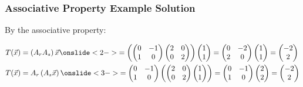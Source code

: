 \begin{frame}
\frametitle{Associative Property Example Solution}

    By the associative property: 

    \begin{align*}
        T(\vec x) &= \left(A_rA_s\right) \vec x \onslide<2->{= \left(\begin{pmatrix} 0&-1\\1&0 \end{pmatrix} \begin{pmatrix} 2&0\\0&2 \end{pmatrix} \right) \begin{pmatrix} 1\\1 \end{pmatrix} = \begin{pmatrix} 0&-2\\2&0 \end{pmatrix}\begin{pmatrix} 1\\1 \end{pmatrix} = \begin{pmatrix} -2\\2 \end{pmatrix}} \\
        T(\vec x) &= A_r\left(A_s \vec x \right) \onslide<3->{= \begin{pmatrix} 0&-1\\1&0 \end{pmatrix} \left( \begin{pmatrix} 2&0\\0&2 \end{pmatrix}  \begin{pmatrix} 1\\1 \end{pmatrix} \right) = \begin{pmatrix} 0&-1\\1&0 \end{pmatrix}\begin{pmatrix} 2\\2 \end{pmatrix} = \begin{pmatrix} -2\\2 \end{pmatrix}}
    \end{align*}

\end{frame}


\frame{
}

\frame{
}
